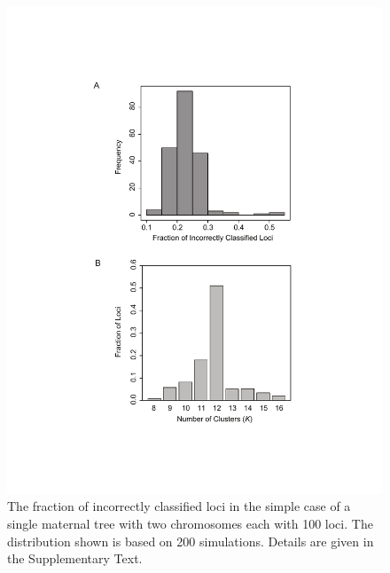 \documentclass[11pt]{article}
\begin{document}
\begin{figure}[ht]
\centering
\includegraphics[width=1.0\textwidth]{misclassified}
\caption{The fraction of incorrectly classified loci in the simple case of a single maternal tree with
two chromosomes each with 100 loci. The distribution shown is based on 200 simulations.
Details are given in the Supplementary Text.}
\label{f:misclassified.pdf}
\end{figure}

\clearpage
\end{document}
